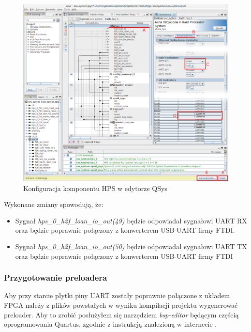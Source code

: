 \begin{figure}[!h]
\includegraphics[width=\textwidth]{qsys.png}
\caption{Konfiguracja komponentu HPS w edytorze QSys}
\label{fig:qsys-hps}
\end{figure}

Wykonane zmiany spowodują, że:
\begin{itemize}[noitemsep]
\item Sygnał \textit{hps\_0\_h2f\_loan\_io\_out(49)} będzie odpowiadał sygnałowi UART RX oraz będzie poprawnie połączony z konwerterem USB-UART firmy FTDI.
\item Sygnał \textit{hps\_0\_h2f\_loan\_io\_out(50)} będzie odpowiadał sygnałowi UART TX oraz będzie poprawnie połączony z konwerterem USB-UART firmy FTDI
\end{itemize}


\subsubsection{Przygotowanie preloadera}
\label{sec:uart-preloader-gen}
Aby przy starcie płytki piny UART zostały poprawnie połączone z układem FPGA należy z plików powstałych w wyniku kompilacji projektu wygenerować preloader. Aby to zrobić posłużyłem się narzędziem \textit{bsp-editor} będącym częścią oprogramowania Quartus, zgodnie z instrukcją znalezioną w internecie \cite{rocketboards-preloader}.

